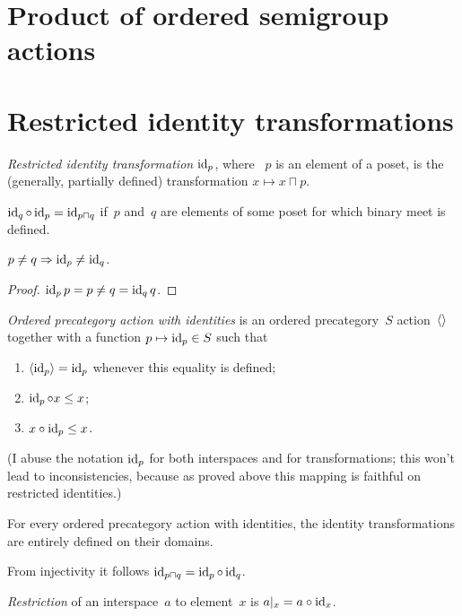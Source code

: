 
\chapter{Product of ordered semigroup actions}


\chapter{Restricted identity transformations}

\emph{Restricted identity transformation} $\operatorname{id}_p$, where ~$p$ is an element of a poset, is the (generally, partially defined) transformation $x\mapsto x\sqcap p$.

\begin{obvious}
$\operatorname{id}_q\circ\operatorname{id}_p = \operatorname{id}_{p\sqcap q}$ if~$p$ and~$q$ are elements of some poset for which binary meet is defined.
\end{obvious}

\begin{prop}
$p\ne q\Rightarrow\operatorname{id}_p\ne\operatorname{id}_q$.
\end{prop}

\begin{proof}
$\operatorname{id}_p p=p \ne q = \operatorname{id}_q q$.
\end{proof}

\emph{Ordered precategory action with identities} is an ordered precategory~$S$ action~$\left\langle \right\rangle$ together with a function $p\mapsto\operatorname{id}_p\in S$ such that
\begin{enumerate}
\item $\left\langle \operatorname{id}_p\right\rangle=\operatorname{id}_p$ whenever this equality is defined;
\item $\operatorname{id}_p\circ x\leq x$;
\item $x\circ\operatorname{id}_p\leq x$.
\end{enumerate}
(I abuse the notation $\operatorname{id}_p$ for both interspaces and for transformations; this won't lead to inconsistencies, because as proved above this mapping is faithful on restricted identities.)

\begin{obvious}
For every ordered precategory action with identities, the identity transformations are entirely defined on their domains.
\end{obvious}

From injectivity it follows $\operatorname{id}_{p\sqcap q} = \operatorname{id}_p\circ\operatorname{id}_q$.

\emph{Restriction} of an interspace~$a$ to element~$x$ is $a|_x=a\circ\operatorname{id}_x$.

